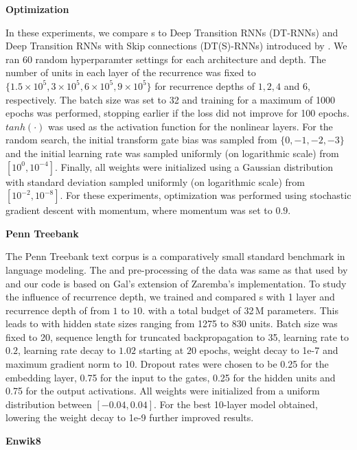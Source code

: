 \documentclass[letterpaper]{article}
\begin{document}
\textbf{Optimization}

In these experiments, we compare \arch{}s to Deep Transition RNNs (DT-RNNs) and Deep Transition RNNs with Skip connections (DT(S)-RNNs) introduced by \citet{pascanu}. 
We ran 60 random hyperparamter settings for each architecture and depth.
The number of units in each layer of the recurrence was fixed to $\{1.5\times 10^5, 3\times 10^5, 6\times 10^5, 9\times 10^5\}$ for recurrence depths of $1, 2, 4$ and $6$, respectively.
The batch size was set to 32 and training for a maximum of 1000 epochs was performed, stopping earlier if the loss did not improve for 100 epochs. 
$tanh(\cdot)$ was used as the activation function for the nonlinear layers.
For the random search, the initial transform gate bias was sampled from $\{0,-1,-2,-3\}$ and the initial learning rate was sampled uniformly (on logarithmic scale) from $[10^{0}, 10^{-4}]$. 
Finally, all weights were initialized using a Gaussian distribution with standard deviation sampled uniformly (on logarithmic scale) from $[10^{-2}, 10^{-8}]$. 
For these experiments, optimization was performed using stochastic gradient descent with momentum, where momentum was set to $0.9$.

\textbf{Penn Treebank}


The Penn Treebank text corpus \citep{penntreebank} is a comparatively small standard benchmark in language modeling. 
The and pre-processing of the data was same as that used by \citet{gal2015} and our code is based on Gal's \citep{gal2015} extension of Zaremba's \citep{zaremba} implementation.
To study the influence of recurrence depth, we trained and compared \arch{}s with 1 layer and recurrence depth of from $1$ to $10$. with a total budget of 32\,M parameters.
This leads to \arch{} with hidden state sizes ranging from 1275 to 830 units. Batch size was fixed to 20, sequence length for truncated backpropagation to 35, learning rate to $0.2$, learning rate decay to $1.02$ starting at $20$ epochs, weight decay to 1e-7 and maximum gradient norm to 10.
Dropout rates were chosen to be 0.25 for the embedding layer, 0.75 for the input to the gates, 0.25 for the hidden units and 0.75 for the output activations. All weights were initialized from a uniform distribution between $[-0.04, 0.04]$.
For the best 10-layer model obtained, lowering the weight decay to 1e-9 further improved results.

\textbf{Enwik8}
\end{document}
